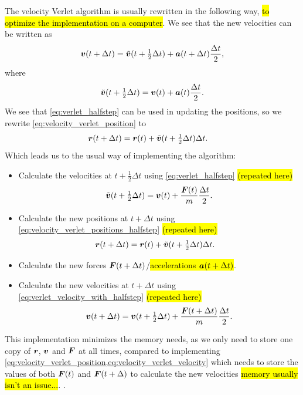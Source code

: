 The velocity Verlet algorithm is usually rewritten in the following way, \hl{to optimize the implementation on a computer}. We see that the new velocities can be written as
\begin{align}
    \boldsymbol{v}(t+\Delta t) = \tilde{\boldsymbol{v}}(t + \tfrac{1}{2}\Delta t) + \boldsymbol{a}(t+\Delta t)\frac{\Delta t}{2}, \label{eq:verlet_velocity_with_halfstep}
\end{align}
where
\begin{align}
    \tilde{\boldsymbol{v}}(t + \tfrac{1}{2}\Delta t) = \boldsymbol{v}(t) + \boldsymbol{a}(t)\frac{\Delta t}{2}.\label{eq:verlet_halfstep}
\end{align}
We see that \cref{eq:verlet_halfstep} can be used in updating the positions, so we rewrite \cref{eq:velocity_verlet_position} to
\begin{align}
    \boldsymbol{r}(t + \Delta t) &= \boldsymbol{r}(t) + \tilde{\boldsymbol{v}}(t+\tfrac{1}{2}\Delta t)\Delta t.\label{eq:velocity_verlet_positions_halfstep}
\end{align}
Which leads us to the usual way of implementing the algorithm\cite{allen1989computer}:
\begin{itemize}
    \item Calculate the velocities at $t+\tfrac{1}{2}\Delta t$ using \cref{eq:verlet_halfstep} \hl{(repeated here)}
    \begin{align*}
        \tilde{\boldsymbol{v}}(t + \tfrac{1}{2}\Delta t) = \boldsymbol{v}(t) + \frac{\boldsymbol{F}(t)}{m}\frac{\Delta t}{2}.
    \end{align*}
    \item Calculate the new positions at $t + \Delta t$ using \cref{eq:velocity_verlet_positions_halfstep} \hl{(repeated here)}
    \begin{align*}
        \boldsymbol{r}(t + \Delta t) &= \boldsymbol{r}(t) + \tilde{\boldsymbol{v}}(t+\tfrac{1}{2}\Delta t)\Delta t.
    \end{align*}
    \item Calculate the new forces $\boldsymbol{F}(t+\Delta t)$/\hl{accelerations $\boldsymbol{a}(t+\Delta t)$}.
    \item Calculate the new velocities at $t+\Delta t$ using \cref{eq:verlet_velocity_with_halfstep} \hl{(repeated here)}
    \begin{align*}
        \boldsymbol{v}(t+\Delta t) = \boldsymbol{v}(t + \tfrac{1}{2}\Delta t) + \frac{\boldsymbol{F}(t + \Delta t)}{m}\frac{\Delta t}{2}.
    \end{align*}
\end{itemize}
This implementation minimizes the memory needs, as we only need to store one copy of $\boldsymbol{r}$, $\boldsymbol{v}$ and $\boldsymbol{F}$ at all times, compared to implementing \cref{eq:velocity_verlet_position,eq:velocity_verlet_velocity} which needs to store the values of both $\boldsymbol{F}(t)$ and $\boldsymbol{F}(t+\Delta)$ to calculate the new velocities \hl{memory usually isn't an issue...}. . 

